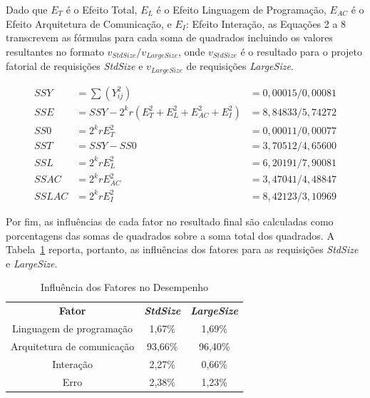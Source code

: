 Dado que $E_T$ é o Efeito Total, 
$E_L$ é o Efeito Linguagem de Programação,
$E_{AC}$ é o Efeito Arquitetura de Comunicação,
e $E_I$: Efeito Interação,
as Equações 2 a 8 transcrevem as fórmulas para cada soma de quadrados incluindo os valores resultantes
no formato $v_{StdSize}/v_{LargeSize}$, onde $v_{StdSize}$ é o resultado para o projeto
fatorial de requisições {\em StdSize} e $v_{LargeSize}$ de requisições {\em LargeSize}.

\vspace{-5pt}
\begin{footnotesize}
\begin{eqnarray}
\label{eq:projeto}
SSY &= \sum (Y_{ij}^2)&{= 0,00015/0,00081} \\
SSE &= SSY - 2^{k}r \left( E_T^2 + E_L^2 + E_{AC}^2 + E_I^2 \right) &{= 8,84833/5,74272} \\
SS0 &= 2^{k}r E_T^2 &{= 0,00011/0,00077} \\
SST &= SSY - SS0 &{= 3,70512/4,65600} \\
SSL &= 2^{k}r E_L^2 &{= 6,20191/7,90081} \\
SSAC &= 2^{k}r E_{AC}^2 &{= 3,47041/4,48847} \\
SSLAC &= 2^{k}r E_I^2 &{= 8,42123/3,10969}
\end{eqnarray}
\end{footnotesize}

Por fim, as influências de cada fator no resultado final são calculadas como porcentagens das somas de quadrados sobre a soma total dos quadrados. A Tabela~\ref{tab:influencia} reporta, portanto, as influências dos fatores para as requisições \textit{StdSize} e \textit{LargeSize}.

\begin{table}[!ht]
    \small
    \centering
    \caption{Influência dos Fatores no Desempenho}
    \label{tab:influencia}
    \vspace{-5pt}
    \begin{tabular}{ccc}
        \textbf{Fator} & \textbf{\textit{StdSize}} & \textbf{\textit{LargeSize}} \\
        Linguagem de programação & 1,67\% & 1,69\% \\
        Arquitetura de comunicação & 93,66\% & 96,40\% \\
        Interação & 2,27\% & 0,66\% \\
        Erro & 2,38\% & 1,23\% \\
    \end{tabular}
\end{table}


